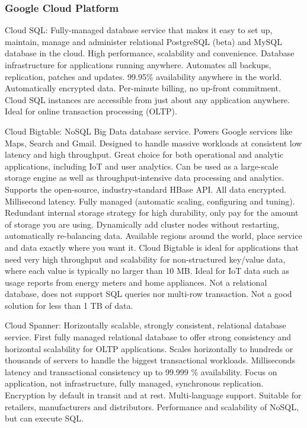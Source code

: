 \subsubsection{Google Cloud Platform}

Cloud SQL: Fully-managed database service that makes it easy to set up, maintain, manage and administer relational PostgreSQL (beta) and MySQL database in the cloud. High performance, scalability and convenience. Database infrastructure for applications running anywhere. Automates all backups, replication, patches and updates. 99.95\% availability anywhere in the world. Automatically encrypted data. Per-minute billing, no up-front commitment. Cloud SQL instances are accessible from just about any application anywhere. Ideal for online transaction processing (OLTP). 

Cloud Bigtable: NoSQL Big Data database service. Powers Google services like Maps, Search and Gmail. Designed to handle massive workloads at consistent low latency and high throughput. Great choice for both operational and analytic applications, including IoT and user analytics. Can be used as a large-scale storage engine as well as throughput-intensive data processing and analytics. Supports the open-source, industry-standard HBase API. All data encrypted. Millisecond latency. Fully managed (automatic scaling, configuring and tuning). Redundant internal storage strategy for high durability, only pay for the amount of storage you are using. Dynamically add cluster nodes without restarting, automatically re-balancing data. Available regions around the world, place service and data exactly where you want it. Cloud Bigtable is ideal for applications that need very high throughput and scalability for non-structured key/value data, where each value is typically no larger than 10 MB. Ideal for IoT data such as usage reports from energy meters and home appliances. Not a relational database, does not support SQL queries nor multi-row transaction. Not a good solution for less than 1 TB of data. 

Cloud Spanner: Horizontally scalable, strongly consistent, relational database service. First fully managed relational database to offer strong consistency and horizontal scalability for OLTP applications. Scales horizontally to hundreds or thousands of servers to handle the biggest transactional workloads. Milliseconds latency and transactional consistency up to 99.999 \% availability. Focus on application, not infrastructure, fully managed, synchronous replication. Encryption by default in transit and at rest. Multi-language support. Suitable for retailers, manufacturers and distributors. Performance and scalability of NoSQL, but can execute SQL. 

